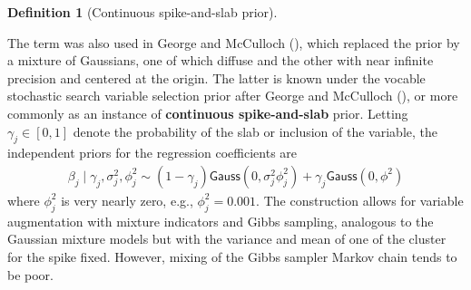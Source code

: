 \documentclass[
  11pt,
  letterpaper,
]{scrbook}
\theoremstyle{plain}
\theoremstyle{plain}
\theoremstyle{plain}
\theoremstyle{definition}
\theoremstyle{definition}
\theoremstyle{definition}
\newtheorem{definition}{Definition}[chapter]
\theoremstyle{remark}
\begin{document}
\begin{definition}[Continuous spike-and-slab
prior]\protect\hypertarget{def-cont-spike-slab}{}\label{def-cont-spike-slab}

The term was also used in George and McCulloch
(), which replaced the prior
by a mixture of Gaussians, one of which diffuse and the other with near
infinite precision and centered at the origin. The latter is known under
the vocable stochastic search variable selection prior after George and
McCulloch (), or more commonly
as an instance of \textbf{continuous spike-and-slab} prior. Letting
\(\gamma_j \in [0,1]\) denote the probability of the slab or inclusion
of the variable, the independent priors for the regression coefficients
are \begin{align*}
 \beta_j \mid \gamma_j, \sigma_j^2,\phi^2_j \sim (1-\gamma_j) \mathsf{Gauss}(0, \sigma_j^2\phi^2_j) + \gamma_j \mathsf{Gauss}(0, \phi^2)
\end{align*} where \(\phi^2_j\) is very nearly zero, e.g.,
\(\phi_j^2=0.001.\) The construction allows for variable augmentation
with mixture indicators and Gibbs sampling, analogous to the Gaussian
mixture models but with the variance and mean of one of the cluster for
the spike fixed. However, mixing of the Gibbs sampler Markov chain tends
to be poor.

\end{definition}
\end{document}
